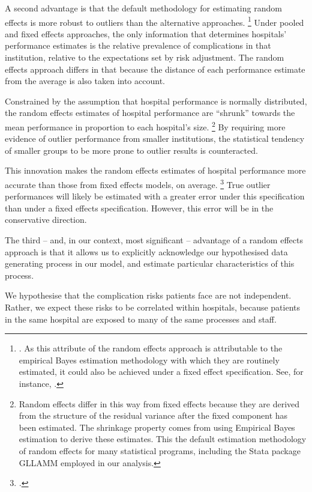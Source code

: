 \documentclass[submission]{grattan}
\begin{document}
A second advantage is that the default methodology for estimating random effects is more robust to outliers than the alternative approaches.%
	\footnote{\textcite{Shahian_2005}. As this attribute of the random effects approach is attributable to the empirical Bayes estimation methodology with which they are routinely estimated, it could also be achieved under a fixed effect specification.
	See, for instance, \textcite{NBERw11463}.}
Under pooled and fixed effects approaches, the only information that determines hospitals' performance estimates is the relative prevalence of complications in that institution, relative to the expectations set by risk adjustment.
The random effects approach differs in that because the distance of each performance estimate from the average is also taken into account.

Constrained by the assumption that hospital performance is normally distributed, the random effects estimates of hospital performance are ``shrunk'' towards the mean performance in proportion to each hospital's size.%
  \footnote{Random effects differ in this way from fixed effects because they are derived from the structure of the residual variance after the fixed component has been estimated.
The shrinkage property comes from using Empirical Bayes estimation to derive these estimates.
This the default estimation methodology of random effects for many statistical programs, including the Stata package GLLAMM employed in our analysis.}
By requiring more evidence of outlier performance from smaller institutions, the statistical tendency of smaller groups to be more prone to outlier results is counteracted.

This innovation makes the random effects estimates of hospital performance more accurate than those from fixed effects models, on average.%
	\footcite{Stein1961}
True outlier performances will likely be estimated with a greater error under this specification than under a fixed effects specification.
However, this error will be in the conservative direction.

The third -- and, in our context, most significant -- advantage of a random effects approach is that it allows us to explicitly acknowledge our hypothesised data generating process in our model, and estimate particular characteristics of this process.

We hypothesise that the complication risks patients face are not independent.
Rather, we expect these risks to be correlated within hospitals, because patients in the same hospital are exposed to many of the same processes and staff.
\end{document}
